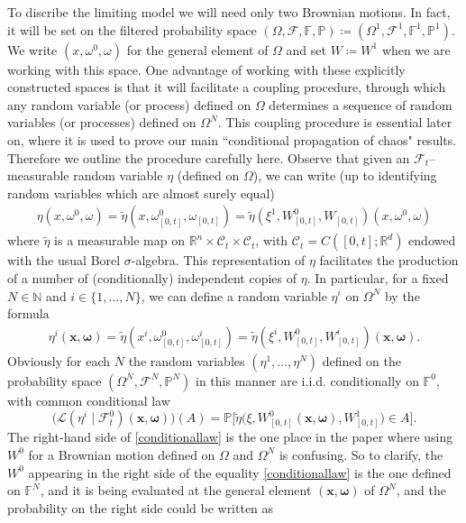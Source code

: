 \documentclass[11pt,reqno]{amsart}
\numberwithin{equation}{section}
\theoremstyle{definition}
\def\R{{\mathbb R}}
\def\N{{\mathbb N}}
\def\P{{\mathcal P}}
\newcommand{\bx}{\mathbf{x}}
\newcommand{\bP}{\mathbb{P}}
\newcommand{\sF}{\mathcal{F}}
\newcommand{\bbF}{\mathbb{F}}
\newcommand{\wt}{\widetilde}
\newcommand\cC{\mathcal C}
\newcommand\cF{\mathcal F}
\newcommand\cL{\mathcal L}
\def \N{\mathbb{N}}
\def \P{\mathbb{P}}
\def \R{\mathbb{R}}
\begin{document}
To discribe the limiting model we will need only two Brownian motions.
In fact, it will be set on the filtered probability space $(\Omega, \sF, \bbF, \bP) \coloneqq (\Omega^1,\sF^1, \bbF^1, \bP^1)$. We write $(x,\omega^0, \omega)$ for the general element of $\Omega$ and set $W \coloneqq W^1$ when we are working with this space. One advantage of working with these explicitly constructed spaces is that it will facilitate a coupling procedure, through which any random variable (or process) defined on $\Omega$ determines a sequence of random variables (or processes) defined on $\Omega^N$. This coupling procedure is essential later on, where it is used to prove our main ``conditional propagation of chaos" results. Therefore we outline the procedure carefully here. Observe that given an $\cF_t$--measurable random variable $\eta$ (defined on $\Omega$), we can write (up to identifying random variables which are almost surely equal) 
\begin{align*}
\eta(x, \omega^0,\omega) = \wt{\eta}(x, \omega^0_{[0,t]}, \omega_{[0,t]}) = \wt{\eta}(\xi^1, W^0_{[0,t]}, W_{[0,t]})(x, \omega^0,\omega)
\end{align*} 
where 
$\wt{\eta}$ is a measurable map on $\R^n \times \cC_t \times \cC_t$, with $\cC_t = C([0,t] ; \R^d)$ endowed with the usual Borel $\sigma$-algebra. This representation of $\eta$ facilitates the production of a number of (conditionally) independent copies of $\eta$. In particular, for a fixed $N \in \N$ and $i \in \{1,\dots,N\}$, we can define a random variable $\eta^i$ on $\Omega^N$ by the formula
\begin{align*}
\eta^i(\bx, \bm \omega) = \wt{\eta}(x^i, \omega^0_{[0,t]}, \omega^i_{[0,t]}) = \wt{\eta}(\xi^i, W^0_{[0,t]}, W^i_{[0,t]})(\bx, \bm \omega). 
\end{align*}
Obviously for each $N$ the random variables $(\eta^1,\dots,\eta^N)$ defined on the probability space $(\Omega^N, \sF^N, \bP^N)$ in this manner are i.i.d. conditionally on $\bbF^0$, with common conditional law
 \begin{equation} \label{conditionallaw}
  \Big(\cL(\eta^i\mid \cF^0_t)(\bx, \bm \omega) \Big)(A) =
   \P\Big[\wt{\eta}\big(\xi, W^0_{[0,t]}(\bx, \bm \omega), W^1_{[0,t]}\big) \in A \Big].
\end{equation}
The right-hand side of \eqref{conditionallaw} is the one place in the paper where using $W^0$ for a Brownian motion defined on $\Omega$ and $\Omega^N$ is confusing. So to clarify, the $W^0$ appearing in the right side of the equality \eqref{conditionallaw} is the one defined on $\bbF^N$, and it is being evaluated at the general element $(\bx, \bm \omega)$ of $\Omega^N$, and the probability on the right side could be written as 
\end{document}
